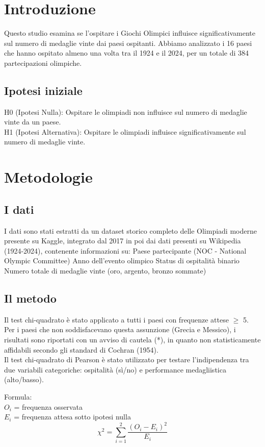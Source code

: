 
\section{Introduzione}
Questo studio esamina se l'ospitare i Giochi Olimpici influisce significativamente 
sul numero di medaglie vinte dai paesi ospitanti. Abbiamo analizzato i 16 paesi 
che hanno ospitato almeno una volta tra il 1924 e il 2024, per un totale di 384 
partecipazioni olimpiche. 
\subsection{Ipotesi iniziale}
H0 (Ipotesi Nulla): Ospitare le olimpiadi non influisce sul numero di medaglie 
vinte da un paese.\\
H1 (Ipotesi Alternativa): Ospitare le olimpiadi influisce significativamente sul
numero di medaglie vinte.

\section{Metodologie}
\subsection{I dati}
I dati sono stati estratti da un dataset storico completo delle Olimpiadi moderne
presente su Kaggle, integrato dal 2017 in poi dai dati presenti su Wikipedia
(1924-2024), contenente informazioni su:
Paese partecipante (NOC - National Olympic Committee)
Anno dell'evento olimpico
Status di ospitalità binario
Numero totale di medaglie vinte (oro, argento, bronzo sommate)

\subsection{Il metodo}
Il test chi-quadrato è stato applicato a tutti i paesi con frequenze attese $\ge$ 
5. Per i paesi che non soddisfacevano questa assunzione (Grecia e Messico), i 
risultati sono riportati con un avviso di cautela (*), in quanto non 
statisticamente affidabili secondo gli standard di Cochran (1954).\\
Il test chi-quadrato di Pearson è stato utilizzato per testare l'indipendenza 
tra due variabili categoriche: ospitalità (sì/no) e performance medagliistica 
(alto/basso).

Formula:\\
$O_i$ = frequenza osservata\\
$E_i$ = frequenza attesa sotto ipotesi nulla
$$\chi^2= \sum_{i=1}^{2} \frac{(O_i - E_i)^2}{E_i}$$

